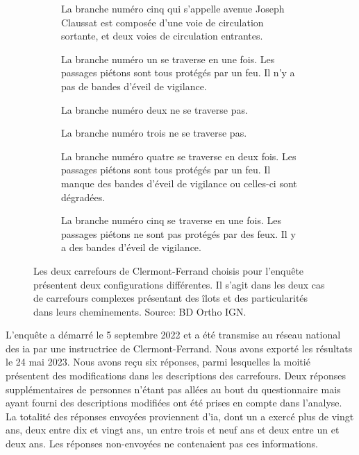 \begin{figure}
\begin{subfigure}[t]{\linewidth}
\begin{minipage}[t]{0.49\linewidth}
            La branche numéro cinq qui s'appelle avenue Joseph Claussat est composée d'une voie de circulation sortante, et deux voies de circulation entrantes.

            \vspace{5pt}

            La branche numéro un se traverse en une fois. Les passages piétons sont tous protégés par un feu. Il n'y a pas de bandes d'éveil de vigilance.

            \vspace{5pt}

            La branche numéro deux ne se traverse pas.

            \vspace{5pt}

            La branche numéro trois ne se traverse pas.

            \vspace{5pt}

            La branche numéro quatre se traverse en deux fois. Les passages piétons sont tous protégés par un feu. Il manque des bandes d'éveil de vigilance ou celles-ci sont dégradées.

            \vspace{5pt}
            
            La branche numéro cinq se traverse en une fois. Les passages piétons ne sont pas protégés par des feux. Il y a des bandes d'éveil de vigilance.
        \end{minipage}
    \end{subfigure}
    \caption[Carrefours choisis pour l'enquête auprès des instructeurs]{Les deux carrefours de Clermont-Ferrand choisis pour l'enquête présentent deux configurations différentes. Il s'agit dans les deux cas de carrefours complexes présentant des îlots et des particularités dans leurs cheminements. Source: BD Ortho IGN.}
    \label{fig:evaluation_carrefours_enquete}
\end{figure}

\newpar{}

L'enquête a démarré le 5 septembre 2022 et a été transmise au réseau national des \gls{ia} par une instructrice de Clermont-Ferrand. Nous avons exporté les résultats le 24 mai 2023. Nous avons reçu six réponses, parmi lesquelles la moitié présentent des modifications dans les descriptions des carrefours. Deux réponses supplémentaires de personnes n'étant pas allées au bout du questionnaire mais ayant fourni des descriptions modifiées ont été prises en compte dans l'analyse. La totalité des réponses envoyées proviennent d'\gls{ia}, dont un a exercé plus de vingt ans, deux entre dix et vingt ans, un entre trois et neuf ans et deux entre un et deux ans. Les réponses non-envoyées ne contenaient pas ces informations.

